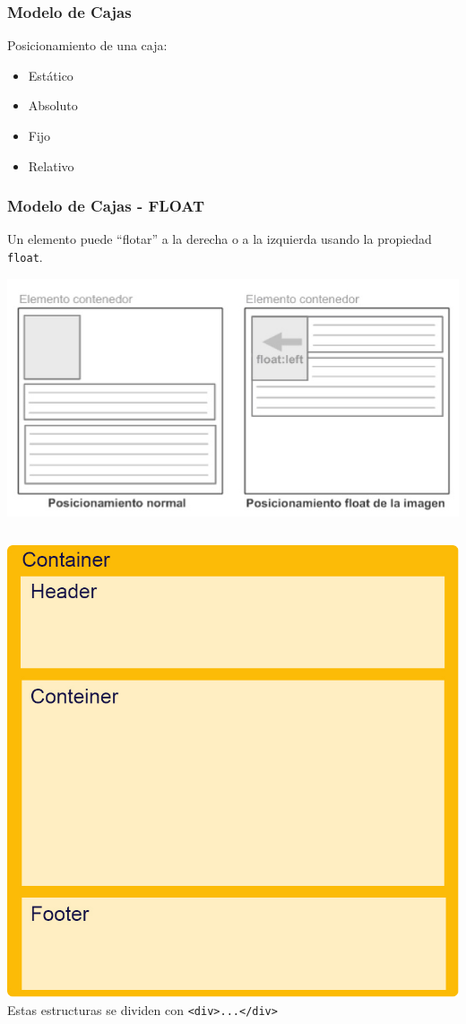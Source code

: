 \documentclass{beamer}
\begin{document}
\begin{frame} %
\frametitle{Modelo de Cajas}
	Posicionamiento de una caja:
	\begin{itemize}
	\item Estático
	\item Absoluto
	\item Fijo
	\item Relativo
	\end{itemize}
\end{frame}

\begin{frame} %
\frametitle{Modelo de Cajas - FLOAT}
	Un elemento puede ``flotar'' a la derecha o a la izquierda usando la propiedad {\tt float}.
	\begin{center}
	\includegraphics[scale=.5]{images/Floats.jpg} 
	\end{center}
\end{frame}

\begin{frame} %
	\begin{columns}[c]
	\includegraphics[scale=.22]{images/PruebaEstructura.jpg} 
	\pause
	Estas estructuras se dividen con {\tt <div>...</div>}
	\end{columns}
\end{frame}
\end{document}
